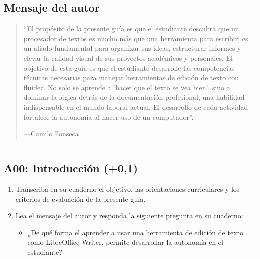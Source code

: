 \documentclass[letterpaper,10pt,spanish]{sphinxmanual}
\begin{document}
\subsection{Mensaje del autor}
\label{\detokenize{1_guias/10ofimatica/G1013:mensaje-del-autor}}\begin{quote}

\sphinxAtStartPar
“El propósito de la presente guía es que el estudiante descubra que un procesador de textos es mucho más que una herramienta para escribir; es un aliado fundamental para organizar sus ideas, estructurar informes y elevar la calidad visual de sus proyectos académicos y personales. El objetivo de esta guía es que el estudiante desarrolle las competencias técnicas necesarias para manejar herramientas de edición de texto con fluidez. No solo se aprende a ‘hacer que el texto se vea bien’, sino a dominar la lógica detrás de la documentación profesional, una habilidad indispensable en el mundo laboral actual. El desarrollo de cada actividad fortalece la autonomía al hacer uso de un computador”.

\begin{flushright}
---Camilo Fonseca
\end{flushright}
\end{quote}


\bigskip\hrule\bigskip



\subsection{A00: Introducción (+0,1)}
\label{\detokenize{1_guias/10ofimatica/G1013:a00-introduccion-0-1}}
\sphinxAtStartPar
{}
\begin{enumerate}
%
\item {} 
\sphinxAtStartPar
Transcriba en su cuaderno el objetivo, las orientaciones curriculares y los criterios de evaluación de la presente guía.

\item {} 
\sphinxAtStartPar
Lea el mensaje del autor y responda la siguiente pregunta en su cuaderno:
\begin{itemize}
\item {} 
\sphinxAtStartPar
¿De qué forma el aprender a usar una herramienta de edición de texto como LibreOffice Writer, permite desarrollar la autonomía en el estudiante?

\end{itemize}

\end{enumerate}
\end{document}
